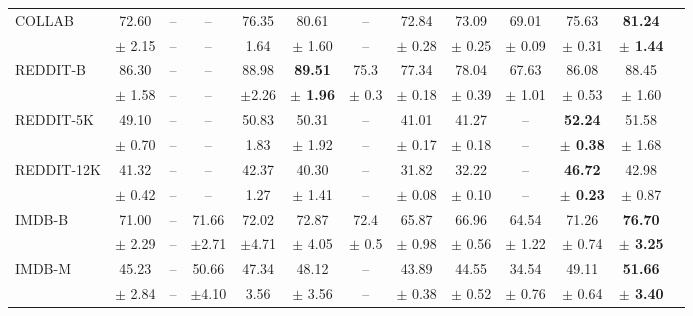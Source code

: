 \documentclass[letterpaper]{article} \usepackage{aaai19}  \usepackage{times}  \usepackage{helvet}  \usepackage{courier}  \usepackage{url}  \usepackage{graphicx}  \frenchspacing  \setlength{\pdfpagewidth}{8.5in}  \setlength{\pdfpageheight}{11in}
\begin{document}
\begin{table*}[!t]
\begin{sc}
{\begin{tabular}{|l| c c c| c c | c c c |c |c |c |c|}
			\midrule
			\multirow{2}{*}{COLLAB}
			& 72.60  &--    &--  &76.35 & 80.61 & -- & 72.84 & 73.09 & 69.01 & 75.63 & \textbf{81.24}     \\			
			& $\pm$ 2.15  &--   &--  &1.64  & $\pm$ 1.60  & --  & $\pm$ 0.28  & $\pm$ 0.25  & $\pm$ 0.09
			& $\pm$ 0.31  & \textbf{$\pm$ 1.44}      \\
			
			\midrule
			\multirow{2}{*}{REDDIT-B}
			& 86.30  &--     &--  &88.98 &\textbf{89.51}  &75.3 & 77.34 & 78.04 & 67.63  & 86.08 & 88.45   \\			
			& $\pm$ 1.58  &--   &--  &$\pm$2.26  & \textbf{$\pm$ 1.96}  & $\pm$ 0.3  & $\pm$ 0.18  & $\pm$ 0.39  & $\pm$ 1.01
			& $\pm$ 0.53  & $\pm$ 1.60     \\
			
			\midrule
			\multirow{2}{*}{REDDIT-5K}
			& 49.10  &--      &--  &50.83   & 50.31 & --  & 41.01 & 41.27 & --  &\textbf{52.24} &51.58 \\		
			& $\pm$ 0.70  &--    &--  &1.83  &$\pm$ 1.92  & --  & $\pm$ 0.17  & $\pm$ 0.18  & --
			& \textbf{$\pm$ 0.38}  & $\pm$ 1.68   \\
			
			\midrule
			\multirow{2}{*}{REDDIT-12K}
			& 41.32  &--      &--  &42.37  & 40.30 & --  & 31.82 & 32.22 & --  & \textbf{46.72} & 42.98 \\			
			& $\pm$ 0.42  &--    &--  &1.27   & $\pm$ 1.41  & -- & $\pm$ 0.08  & $\pm$ 0.10  & --
			& \textbf{$\pm$ 0.23} & $\pm$ 0.87     \\
			
			\midrule
			\multirow{2}{*}{IMDB-B}
			& 71.00   &--    &71.66  &72.02 & 72.87 & 72.4 & 65.87 & 66.96 & 64.54 	& 71.26 & \textbf{76.70}     \\			
			& $\pm$ 2.29  &--    &$\pm$2.71  &$\pm$4.71  & $\pm$ 4.05  & $\pm$ 0.5  & $\pm$ 0.98  & $\pm$ 0.56  & $\pm$ 1.22
			& $\pm$ 0.74  & \textbf{$\pm$ 3.25}      \\
			
			\midrule
			\multirow{2}{*}{IMDB-M}
			& 45.23 &--     &50.66  &47.34  & 48.12 & -- & 43.89 & 44.55 & 34.54 & 49.11 & \textbf{51.66}      \\			
			& $\pm$ 2.84  &--  &$\pm$4.10  &3.56  & $\pm$ 3.56  & -- & $\pm$ 0.38  & $\pm$ 0.52  & $\pm$ 0.76
			& $\pm$ 0.64  & \textbf{$\pm$ 3.40}      \\
			\bottomrule
		\end{tabular}
	}
	\end{sc}
	\label{table:state-of-the-art}
\end{table*}
\end{document}
